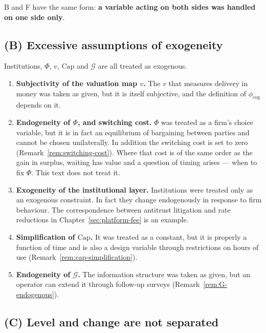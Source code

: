 B and F have the same form: \textbf{a variable acting on both sides was handled on one side
only}.

\subsection{(B) Excessive assumptions of exogeneity}

Institutions, $\Phi$, $v$, $\mathrm{Cap}$ and $\mathcal{G}$ are all treated as exogenous.

\begin{enumerate}[label=(\arabic*)]
\item \textbf{Subjectivity of the valuation map $v$.}
The $v$ that measures delivery in money was taken as given, but it is itself subjective, and
the definition of $\phi_{\mathrm{cog}}$ depends on it.

\item \textbf{Endogeneity of $\Phi$, and switching cost.}
$\Phi$ was treated as a firm's choice variable, but it is in fact an equilibrium of
bargaining between parties and cannot be chosen unilaterally. In addition the switching cost
is set to zero (Remark~\ref{rem:switching-cost}). Where that cost is of the same order as the
gain in surplus, waiting has value and a question of timing arises --- when to fix $\Phi$.
This text does not treat it.

\item \textbf{Exogeneity of the institutional layer.}
Institutions were treated only as an exogenous constraint. In fact they change endogenously in
response to firm behaviour. The correspondence between antitrust litigation and rate
reductions in Chapter~\ref{sec:platform-fee} is an example.

\item \textbf{Simplification of $\mathrm{Cap}$.}
It was treated as a constant, but it is properly a function of time and is also a design
variable through restrictions on hours of use (Remark~\ref{rem:cap-simplification}).

\item \textbf{Endogeneity of $\mathcal{G}$.}
The information structure was taken as given, but an operator can extend it through follow-up
surveys (Remark~\ref{rem:G-endogenous}).
\end{enumerate}

\subsection{(C) Level and change are not separated}
\label{sec:level-change-gap}

